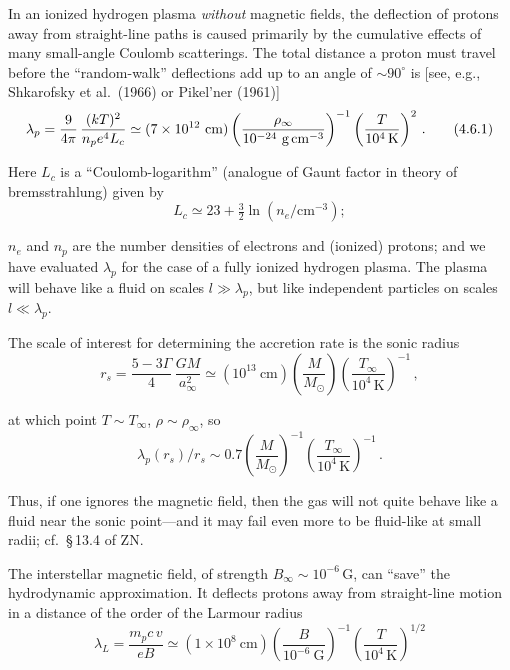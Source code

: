 In an ionized hydrogen plasma \emph{without} magnetic fields, the deflection of
protons away from straight-line paths is caused primarily by the cumulative
effects of many small-angle Coulomb scatterings.  The total distance a proton
must travel before the ``random-walk'' deflections add up to an angle of ${\sim}90^\circ$
is [see, e.g., Shkarofsky et al.\ (1966) or Pikel'ner (1961)]
%
\begin{equation}
\lambda_p = \frac{9}{4\pi}\,\frac{(kT)^2}{n_p e^4 L_c}
\simeq (7 \times 10^{12}~\text{cm})\left(\frac{\rho_\infty}{10^{-24}~\text{g\,cm}^{-3}}\right)^{-1}
\left(\frac{T}{10^4\,\text{K}}\right)^{2}\,.
\tag{4.6.1}
\end{equation}

Here $L_c$ is a ``Coulomb-logarithm'' (analogue of Gaunt factor in theory of
bremsstrahlung) given by
%
\begin{equation}
L_c \simeq 23 + \tfrac{3}{2}\ln (n_e/\text{cm}^{-3});
\tag{4.6.2}
\end{equation}

$n_e$ and $n_p$ are the number densities of electrons and (ionized) protons; and we
have evaluated $\lambda_p$ for the case of a fully ionized hydrogen plasma.  The plasma
will behave like a fluid on scales $l \gg \lambda_p$, but like independent particles on scales
$l \ll \lambda_p$.

The scale of interest for determining the accretion rate is the sonic radius
%
\begin{equation}
r_s = \frac{5 - 3\Gamma}{4}\,\frac{GM}{a_\infty^2}
\simeq (10^{13}~\text{cm})\left(\frac{M}{M_\odot}\right)
\left(\frac{T_\infty}{10^4\,\text{K}}\right)^{-1}\,,
\tag{4.6.3}
\end{equation}

at which point $T \sim T_\infty$, $\rho \sim \rho_\infty$, so
%
\begin{equation}
\lambda_p(r_s)/r_s \sim 0.7 \left(\frac{M}{M_\odot}\right)^{-1}
\left(\frac{T_\infty}{10^4\,\text{K}}\right)^{-1}\,.
\tag{4.6.4}
\end{equation}

Thus, if one ignores the magnetic field, then the gas will not quite behave like a
fluid near the sonic point---and it may fail even more to be fluid-like at small
radii; cf.\ \S\,13.4 of ZN.

The interstellar magnetic field, of strength $B_\infty \sim 10^{-6}$\,G, can ``save'' the
hydrodynamic approximation.  It deflects protons away from straight-line
motion in a distance of the order of the Larmour radius
%
\begin{equation}
\lambda_L = \frac{m_p c\,v}{eB}
\simeq (1 \times 10^{8}~\text{cm})
\left(\frac{B}{10^{-6}~\text{G}}\right)^{-1}
\left(\frac{T}{10^4\,\text{K}}\right)^{1/2}
\tag{4.6.5}
\end{equation}

